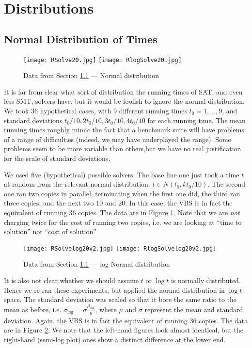 \documentclass{easychair}
\begin{document}
\section{Distributions}
\subsection{Normal Distribution of Times}\label{sec:Normal}
\begin{figure}[h]
\caption{Data from Section \ref{sec:Normal} --- Normal distribution\label{Fig:Normal}}
\texttt{[image: RSolve20.jpg]}
\texttt{[image: RlogSolve20.jpg]}
\end{figure}
It is far from clear what sort of distribution the running times of SAT, and even less SMT, solvers have, but it would be foolish to ignore the normal distribution. We took 36 hypothetical cases, with 9 different running times $t_0=1,\ldots,9$, and standard deviations $t_0/10,2t_0/10,3t_0/10,4t_0/10$ for each running time. The mean running times roughly mimic the fact that a benchmark suite will have problems of a range of difficulties (indeed, we may have underplayed the range). Some problems seem to be more variable than others,but we have no real justification for the scale of standard deviations.

We used five (hypothetical) possible solvers. The base line one just took a time $t$ at random from the relevant normal distribution: $t \in N(t_0,kt_0/10)$. The second one ran two copies in parallel, terminating when the first one did, the third ran three copies, and the next two 10 and 20. In this case, the VBS is in fact the equivalent of running 36 copies.
The data are in Figure  \ref{Fig:Normal}. Note that we are \emph{not} charging twice for the cost of running two copies, i.e. we are looking at ``time to solution'' not ``cost of solution''
\begin{figure}[h]
\caption{Data from Section \ref{sec:Normal} --- log Normal distribution\label{Fig:Normallog}}
\texttt{[image: RSolvelog20v2.jpg]}
\texttt{[image: RlogSolvelog20v2.jpg]}
\end{figure}

It is also not clear whether we should assume $t$ or $\log t$ is normally distributed. Hence we re-ran these experiments, but applied the normal distribution in $\log t$-space. The standard deviation was scaled so that it bore the same ratio to the mean as before, i.e. $\sigma_{\log}=\sigma\frac{\mu_{\log}}\mu$, where $\mu$ and $\sigma$ represent the mean and standard deviation.
Again, the VBS is in fact the equivalent of running 36 copies.
The data are in Figure  \ref{Fig:Normallog}. We note that the left-hand figures look almost identical, but the right-hand (semi-log plot) ones show a distinct difference at the lower end.
\end{document}
